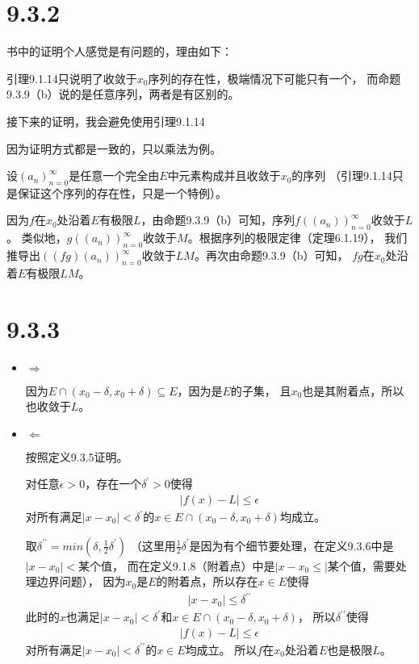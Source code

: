 \documentclass{article}
\begin{document}
\section*{9.3.2}

\begin{zremark}
  书中的证明个人感觉是有问题的，理由如下：

  引理9.1.14只说明了收敛于$x_0$序列的存在性，极端情况下可能只有一个，
  而命题9.3.9（b）说的是任意序列，两者是有区别的。

  接下来的证明，我会避免使用引理9.1.14
\end{zremark}

因为证明方式都是一致的，只以乘法为例。

设$(a_n)_{n=0}^\infty$是任意一个完全由$E$中元素构成并且收敛于$x_0$的序列
（引理9.1.14只是保证这个序列的存在性，只是一个特例）。

因为$f$在$x_0$处沿着$E$有极限$L$，由命题9.3.9（b）可知，序列$f((a_n))_{n=0}^\infty$收敛于$L$。
类似地，$g((a_n))_{n=0}^\infty$收敛于$M$。根据序列的极限定律（定理6.1.19），
我们推导出$((fg)(a_n))_{n=0}^\infty$收敛于$LM$。再次由命题9.3.9（b）可知，
$fg$在$x_0$处沿着$E$有极限$LM$。

\section*{9.3.3}

\begin{itemize}
  \item $\Rightarrow$

        因为$ E \cap (x_0 - \delta, x_0 + \delta) \subseteq E$，因为是$E$的子集，
        且$x_0$也是其附着点，所以也收敛于$L$。
  \item $\Leftarrow$

        按照定义9.3.5证明。

        对任意$\epsilon > 0$，存在一个$\delta^\prime > 0$使得
        \begin{align*}
          |f(x) - L| \leq \epsilon
        \end{align*}
        对所有满足$|x - x_0| < \delta^\prime$的$x \in E \cap (x_0 - \delta, x_0 + \delta)$均成立。

        取$\delta^{\prime\prime} = min(\delta, \frac{1}{2}\delta^\prime)$
        （这里用$\frac{1}{2}\delta^\prime$是因为有个细节要处理，在定义9.3.6中是$|x-x_0| < $某个值，
        而在定义9.1.8（附着点）中是$|x - x_0 \leq |$某个值，需要处理边界问题），
        因为$x_0$是$E$的附着点，所以存在$x \in E$使得
        \begin{align*}
          |x - x_0| \leq \delta^{\prime\prime}
        \end{align*}
        此时的$x$也满足$|x - x_0| < \delta^\prime$和$x \in E \cap (x_0 - \delta, x_0 + \delta)$，
        所以$\delta^{\prime\prime}$使得
        \begin{align*}
          |f(x) - L| \leq \epsilon
        \end{align*}
        对所有满足$|x - x_0| < \delta^{\prime\prime}$的$x \in E$均成立。
        所以$f$在$x_0$处沿着$E$也是极限$L$。

\end{itemize}
\end{document}
